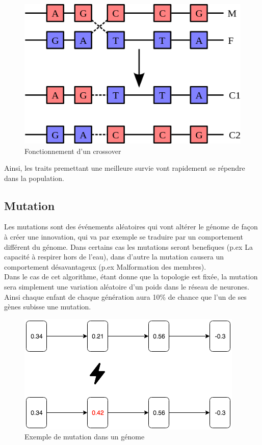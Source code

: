 \documentclass{article}
\begin{document}
\begin{figure}[h]
\begin{center}
	\includegraphics[scale=0.4]{"crossover.png"} 
	\caption{Fonctionnement d'un crossover}
\end{center}
\end{figure}
\newpage

Ainsi, les traits premettant une meilleure survie vont rapidement se répendre dans la population.

\subsection{Mutation}

Les mutations sont des événements aléatoires qui vont altérer le génome de façon à créer une innovation, qui va par exemple se traduire par un comportement différent du génome. Dans certains cas les mutations seront benefiques (p.ex La capacité à respirer hors de l'eau), dans d'autre la mutation causera un comportement désavantageux (p.ex Malformation des membres).\\

Dans le cas de cet algorithme, étant donne que la topologie est fixée, la mutation sera simplement une variation aléatoire d'un poids dans le réseau de neurones. Ainsi chaque enfant de chaque génération aura 10\% de chance que l'un de ses gènes subisse une mutation.

\begin{figure}[h]
\begin{center}
	\includegraphics[scale=0.6]{mutation.png}
	\caption{Exemple de mutation dans un génome}
\end{center}
\end{figure}
\end{document}
